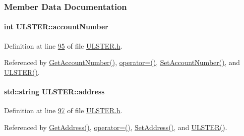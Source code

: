 \subsubsection{Member Data Documentation}
\paragraph[{\texorpdfstring{account\+Number}{accountNumber}}]{\setlength{\rightskip}{0pt plus 5cm}int U\+L\+S\+T\+E\+R\+::account\+Number\hspace{0.3cm}{\ttfamily [private]}}\hypertarget{class_u_l_s_t_e_r_a13f0c2ce30f9e66e896633d81c9af979_a13f0c2ce30f9e66e896633d81c9af979}{}\label{class_u_l_s_t_e_r_a13f0c2ce30f9e66e896633d81c9af979_a13f0c2ce30f9e66e896633d81c9af979}


Definition at line \hyperlink{_u_l_s_t_e_r_8h_source_l00095}{95} of file \hyperlink{_u_l_s_t_e_r_8h_source}{U\+L\+S\+T\+E\+R.\+h}.



Referenced by \hyperlink{_u_l_s_t_e_r_8cpp_source_l00078}{Get\+Account\+Number()}, \hyperlink{_u_l_s_t_e_r_8h_source_l00062}{operator=()}, \hyperlink{_u_l_s_t_e_r_8cpp_source_l00074}{Set\+Account\+Number()}, and \hyperlink{_u_l_s_t_e_r_8h_source_l00024}{U\+L\+S\+T\+E\+R()}.

\paragraph[{\texorpdfstring{address}{address}}]{\setlength{\rightskip}{0pt plus 5cm}std\+::string U\+L\+S\+T\+E\+R\+::address\hspace{0.3cm}{\ttfamily [private]}}\hypertarget{class_u_l_s_t_e_r_a7a13c5988ddafa47b8d6eea3e77fd786_a7a13c5988ddafa47b8d6eea3e77fd786}{}\label{class_u_l_s_t_e_r_a7a13c5988ddafa47b8d6eea3e77fd786_a7a13c5988ddafa47b8d6eea3e77fd786}


Definition at line \hyperlink{_u_l_s_t_e_r_8h_source_l00097}{97} of file \hyperlink{_u_l_s_t_e_r_8h_source}{U\+L\+S\+T\+E\+R.\+h}.



Referenced by \hyperlink{_u_l_s_t_e_r_8cpp_source_l00062}{Get\+Address()}, \hyperlink{_u_l_s_t_e_r_8h_source_l00062}{operator=()}, \hyperlink{_u_l_s_t_e_r_8cpp_source_l00058}{Set\+Address()}, and \hyperlink{_u_l_s_t_e_r_8h_source_l00024}{U\+L\+S\+T\+E\+R()}.

